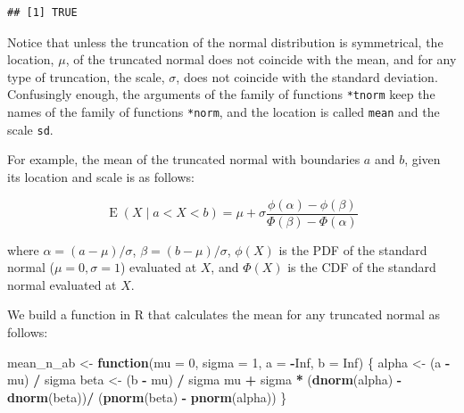 \documentclass[12pt,]{krantz}
\newenvironment{Shaded}{\begin{snugshade}}{\end{snugshade}}
\newcommand{\KeywordTok}[1]{\textcolor[rgb]{0.13,0.29,0.53}{\textbf{#1}}}
\newcommand{\DataTypeTok}[1]{\textcolor[rgb]{0.13,0.29,0.53}{#1}}
\newcommand{\DecValTok}[1]{\textcolor[rgb]{0.00,0.00,0.81}{#1}}
\newcommand{\StringTok}[1]{\textcolor[rgb]{0.31,0.60,0.02}{#1}}
\newcommand{\OtherTok}[1]{\textcolor[rgb]{0.56,0.35,0.01}{#1}}
\newcommand{\ControlFlowTok}[1]{\textcolor[rgb]{0.13,0.29,0.53}{\textbf{#1}}}
\newcommand{\OperatorTok}[1]{\textcolor[rgb]{0.81,0.36,0.00}{\textbf{#1}}}
\newcommand{\NormalTok}[1]{#1}
\theoremstyle{definition}
\theoremstyle{definition}
\theoremstyle{definition}
\theoremstyle{remark}
\begin{document}
\begin{verbatim}
## [1] TRUE
\end{verbatim}

Notice that unless the truncation of the normal distribution is
symmetrical, the location, \(\mu\), of the truncated normal does not
coincide with the mean, and for any type of truncation, the scale,
\(\sigma\), does not coincide with the standard deviation. Confusingly
enough, the arguments of the family of functions \texttt{*tnorm} keep
the names of the family of functions \texttt{*norm}, and the location is
called \texttt{mean} and the scale \texttt{sd}.

For example, the mean of the truncated normal with boundaries \(a\) and
\(b\), given its location and scale is as follows:

\begin{equation}
\operatorname {E} (X\mid a<X<b) = \mu +\sigma {\frac {\phi (\alpha )-\phi (\beta )}{\Phi (\beta )-\Phi (\alpha )}} 
\end{equation}

where \(\alpha =(a-\mu )/\sigma\), \(\beta =(b-\mu )/\sigma\),
\(\phi(X)\) is the PDF of the standard normal (\(\mu=0, \sigma=1\))
evaluated at \(X\), and \(\Phi(X)\) is the CDF of the standard normal
evaluated at \(X\).

We build a function in R that calculates the mean for any truncated
normal as follows:

\begin{Shaded}
\begin{Highlighting}[]
\NormalTok{mean_n_ab <-}\StringTok{ }\ControlFlowTok{function}\NormalTok{(}\DataTypeTok{mu =} \DecValTok{0}\NormalTok{, }\DataTypeTok{sigma =} \DecValTok{1}\NormalTok{, }\DataTypeTok{a =} \OperatorTok{-}\OtherTok{Inf}\NormalTok{, }\DataTypeTok{b =} \OtherTok{Inf}\NormalTok{) \{}
\NormalTok{  alpha <-}\StringTok{ }\NormalTok{(a }\OperatorTok{-}\StringTok{ }\NormalTok{mu) }\OperatorTok{/}\StringTok{ }\NormalTok{sigma}
\NormalTok{  beta <-}\StringTok{ }\NormalTok{(b }\OperatorTok{-}\StringTok{ }\NormalTok{mu) }\OperatorTok{/}\StringTok{ }\NormalTok{sigma}
\NormalTok{  mu }\OperatorTok{+}\StringTok{ }\NormalTok{sigma }\OperatorTok{*}\StringTok{ }\NormalTok{(}\KeywordTok{dnorm}\NormalTok{(alpha) }\OperatorTok{-}\StringTok{ }\KeywordTok{dnorm}\NormalTok{(beta))}\OperatorTok{/}
\StringTok{    }\NormalTok{(}\KeywordTok{pnorm}\NormalTok{(beta) }\OperatorTok{-}\StringTok{ }\KeywordTok{pnorm}\NormalTok{(alpha))}
\NormalTok{\}}
\end{Highlighting}
\end{Shaded}
\end{document}
